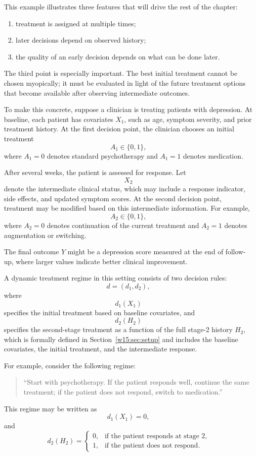 \documentclass[master.tex]{subfiles}
\begin{document}
This example illustrates three features that will drive the rest of the chapter:
\begin{enumerate}
  \item treatment is assigned at multiple times;
  \item later decisions depend on observed history;
  \item the quality of an early decision depends on what can be done later.
\end{enumerate}
The third point is especially important. The best initial treatment cannot be chosen myopically; it must be evaluated in light of the future treatment options that become available after observing intermediate outcomes.

To make this concrete, suppose a clinician is treating patients with depression. At baseline, each patient has covariates \(X_1\), such as age, symptom severity, and prior treatment history. At the first decision point, the clinician chooses an initial treatment
\[
A_1 \in \{0,1\},
\]
where \(A_1=0\) denotes standard psychotherapy and \(A_1=1\) denotes medication.

After several weeks, the patient is assessed for response. Let
\[
X_2
\]
denote the intermediate clinical status, which may include a response indicator, side effects, and updated symptom scores. At the second decision point, treatment may be modified based on this intermediate information. For example,
\[
A_2 \in \{0,1\},
\]
where \(A_2=0\) denotes continuation of the current treatment and \(A_2=1\) denotes augmentation or switching.

The final outcome \(Y\) might be a depression score measured at the end of follow-up, where larger values indicate better clinical improvement.

A dynamic treatment regime in this setting consists of two decision rules:
\[
d=(d_1,d_2),
\]
where
\[
d_1(X_1)
\]
specifies the initial treatment based on baseline covariates, and
\[
d_2(H_2)
\]
specifies the second-stage treatment as a function of the full stage-2 history $H_2$, which is formally defined in Section~\ref{w15:sec:setup} and includes the baseline covariates, the initial treatment, and the intermediate response.

For example, consider the following regime:
\begin{quote}
``Start with psychotherapy. If the patient responds well, continue the same treatment; if the patient does not respond, switch to medication.''
\end{quote}
This regime may be written as
\[
d_1(X_1)=0,
\]
and
\[
d_2(H_2)=
\begin{cases}
0, & \text{if the patient responds at stage 2,}\\
1, & \text{if the patient does not respond.}
\end{cases}
\]
\end{document}
